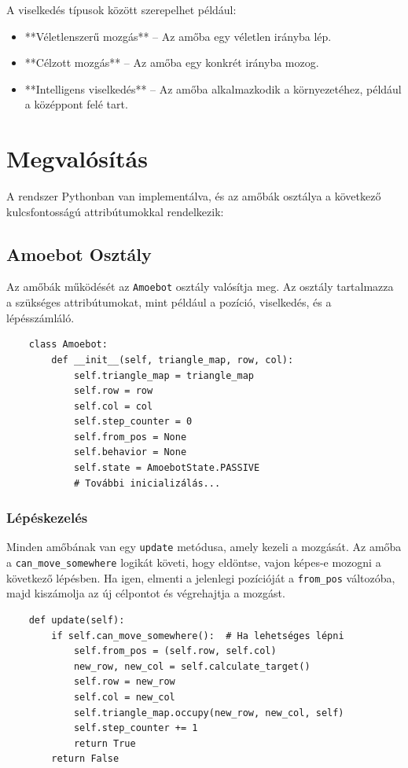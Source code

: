 \documentclass[	
  noindent
]{elteikthesis}[2024/04/26]
\begin{document}
    A viselkedés típusok között szerepelhet például:
    \begin{itemize}
        \item **Véletlenszerű mozgás** – Az amőba egy véletlen irányba lép.
        \item **Célzott mozgás** – Az amőba egy konkrét irányba mozog.
        \item **Intelligens viselkedés** – Az amőba alkalmazkodik a környezetéhez, például a középpont felé tart.
    \end{itemize}
    
    \section{Megvalósítás}
    A rendszer Pythonban van implementálva, és az amőbák osztálya a következő kulcsfontosságú attribútumokkal rendelkezik:
    
    \subsection{Amoebot Osztály}
    Az amőbák működését az \texttt{Amoebot} osztály valósítja meg. Az osztály tartalmazza a szükséges attribútumokat, mint például a pozíció, viselkedés, és a lépésszámláló.
    
    \begin{verbatim}
    class Amoebot:
        def __init__(self, triangle_map, row, col):
            self.triangle_map = triangle_map
            self.row = row
            self.col = col
            self.step_counter = 0
            self.from_pos = None
            self.behavior = None
            self.state = AmoebotState.PASSIVE
            # További inicializálás...
    \end{verbatim}
    
    \subsubsection{Lépéskezelés}
    Minden amőbának van egy \texttt{update} metódusa, amely kezeli a mozgását. Az amőba a \texttt{can\_move\_somewhere} logikát követi, hogy eldöntse, vajon képes-e mozogni a következő lépésben. Ha igen, elmenti a jelenlegi pozícióját a \texttt{from\_pos} változóba, majd kiszámolja az új célpontot és végrehajtja a mozgást.
    
    \begin{verbatim}
    def update(self):
        if self.can_move_somewhere():  # Ha lehetséges lépni
            self.from_pos = (self.row, self.col)
            new_row, new_col = self.calculate_target()
            self.row = new_row
            self.col = new_col
            self.triangle_map.occupy(new_row, new_col, self)
            self.step_counter += 1
            return True
        return False
    \end{verbatim}
    
\end{document}
